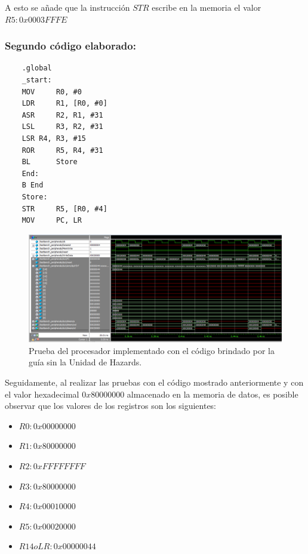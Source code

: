 A esto se añade que la instrucción $STR$ escribe en la memoria el valor $R5:0x0003FFFE$ %
\subsubsection*{Segundo código elaborado:}
\begin{lstlisting}
	.global
	_start:
	MOV 	R0, #0
	LDR 	R1, [R0, #0]
	ASR 	R2, R1, #31
	LSL 	R3, R2, #31
	LSR	R4, R3, #15
	ROR 	R5, R4, #31
	BL		Store
	End:
	B End
	Store:
	STR		R5, [R0, #4]
	MOV		PC, LR
\end{lstlisting}

\begin{figure}[H]
	\centering
	\includegraphics[width = \linewidth]{images/SimulacionGuiaSinHazards.PNG}
	\caption{Prueba del procesador implementado con el código brindado por la guía sin la Unidad de Hazards.}
	\label{fig:Código guiá sin unidad de Hazards}
\end{figure}

Seguidamente, al realizar las pruebas con el código mostrado anteriormente y con el valor hexadecimal $0x80000000$ almacenado en la memoria de datos, es posible observar que los valores de los registros son los siguientes:
\begin{itemize}
	\item $R0:0x00000000$
	\item $R1:0x80000000$
	\item $R2:0xFFFFFFFF$
	\item $R3:0x80000000$
	\item $R4:0x00010000$
	\item $R5:0x00020000$
	\item $R14 o LR:0x00000044$
\end{itemize}

